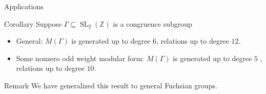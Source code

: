 \documentclass{beamer}
\theoremstyle{remark}
\newcommand\BH{{\mathbb H}}
\newcommand\BC{{\mathbb C}}
\newcommand\BZ{{\mathbb Z}}
\newcommand \sx{{\mathscr X}}
\newcommand{\SL}{\operatorname{SL}}
\begin{document}
\begin{frame}{Applications}
%
%


\begin{block}{Corollary}
Suppose $\Gamma \subseteq \SL_2(\BZ)$ is a congruence subgroup
\begin{itemize}
\item General: $M(\Gamma)$ is generated up to degree $6$, relations up to degree $12$. 
\item Some nonzero odd weight modular form: $M(\Gamma)$ is generated up to degree $5$ , relations up to degree $10$.
\end{itemize}
\end{block}

\begin{block}{Remark}
We have generalized this result to general Fuchsian groups.
\end{block}
\end{frame}

%
%
\end{document}
